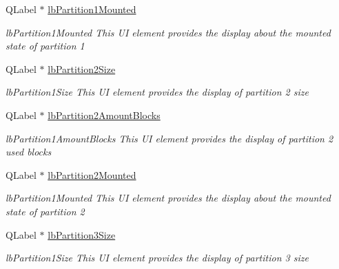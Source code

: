 \begin{DoxyCompactItemize}
Q\+Label $\ast$ \mbox{\hyperlink{class_disk_info_a4863cdef7ad1b794958ed5ce11f98a0c}{lb\+Partition1\+Mounted}}
\begin{DoxyCompactList}\small\item\em lb\+Partition1\+Mounted This UI element provides the display about the mounted state of partition 1 \end{DoxyCompactList}\item 
\mbox{\label{class_disk_info_a9419691f748653a2f9629e59a67ea39a}} 
Q\+Label $\ast$ \mbox{\hyperlink{class_disk_info_a9419691f748653a2f9629e59a67ea39a}{lb\+Partition2\+Size}}
\begin{DoxyCompactList}\small\item\em lb\+Partition1\+Size This UI element provides the display of partition 2 size \end{DoxyCompactList}\item 
\mbox{\label{class_disk_info_ac7d101d3a21ca058a855a885e79949e0}} 
Q\+Label $\ast$ \mbox{\hyperlink{class_disk_info_ac7d101d3a21ca058a855a885e79949e0}{lb\+Partition2\+Amount\+Blocks}}
\begin{DoxyCompactList}\small\item\em lb\+Partition1\+Amount\+Blocks This UI element provides the display of partition 2 used blocks \end{DoxyCompactList}\item 
\mbox{\label{class_disk_info_a950d6590976f14155ea12bee229f13f3}} 
Q\+Label $\ast$ \mbox{\hyperlink{class_disk_info_a950d6590976f14155ea12bee229f13f3}{lb\+Partition2\+Mounted}}
\begin{DoxyCompactList}\small\item\em lb\+Partition1\+Mounted This UI element provides the display about the mounted state of partition 2 \end{DoxyCompactList}\item 
\mbox{\label{class_disk_info_a2913bf89ef8af9b3d698ca1c6a1b24cb}} 
Q\+Label $\ast$ \mbox{\hyperlink{class_disk_info_a2913bf89ef8af9b3d698ca1c6a1b24cb}{lb\+Partition3\+Size}}
\begin{DoxyCompactList}\small\item\em lb\+Partition1\+Size This UI element provides the display of partition 3 size \end{DoxyCompactList}\item 

\end{DoxyCompactItemize}
